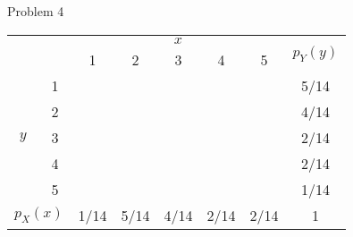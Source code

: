 \documentclass[12pt,border=4pt,multi]{article} %
\begin{document}
\newpage
\noindent
Problem 4
{\large
\begin{table}[!ht]
    \centering
        \begin{tabular}{|c|c|c|c|c|c|c|c|} \cline{3-8}
            \multicolumn{2}{c}{} & \multicolumn{5}{|c|}{$x$} & \multicolumn{1}{c|}{\multirow{2}{*}{$p_Y(y)$}}\\ \cline{3-7}
            \multicolumn{2}{c|}{} & 1 & 2 & 3 & 4 & 5 &\\ \hline
            \multirow{5}{*}{$y$} & 1 & & & & & & 5/14\\ \cline{2-8}
             & 2 & & & & & & 4/14\\ \cline{2-8}
             & 3 & & & & & & 2/14\\ \cline{2-8}
             & 4 & & & & & & 2/14\\ \cline{2-8}
             & 5 & & & & & & 1/14\\ \hline
             \multicolumn{2}{|c|}{$p_X(x)$} & 1/14 & 5/14 & 4/14 & 2/14 & 2/14 & 1\\ \hline
        \end{tabular}
\end{table}
}
\end{document}
